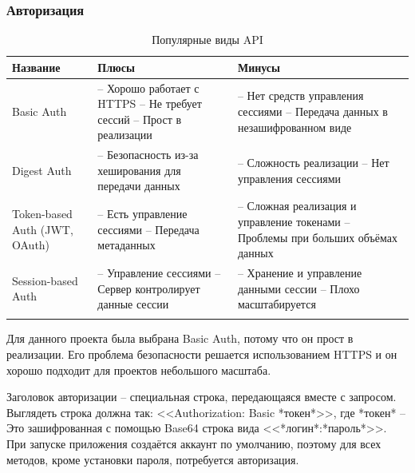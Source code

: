\documentclass[a4paper,article]{article}
\begin{document}
\begin{sloppypar}
    \subsubsection{Авторизация}

    \begin{xltabular}{\textwidth} { |
            >{\hsize} X |
            >{\hsize} X |
            >{\hsize} X | }
        \hline
        Название & Плюсы & Минусы \\
        \hline
        Basic Auth
        & -- Хорошо работает с HTTPS \newline -- Не требует сессий \newline -- Прост в реализации
        & -- Нет средств управления сессиями \newline -- Передача данных в незашифрованном виде \\
        \hline
        Digest Auth
        & -- Безопасность из-за хеширования для передачи данных
        & -- Сложность реализации \newline -- Нет управления сессиями \\
        \hline
        Token-based Auth \newline (JWT, OAuth)
        & -- Есть управление сессиями \newline -- Передача метаданных
        & -- Сложная реализация и управление токенами \newline -- Проблемы при больших объёмах данных \\
        \hline
        Session-based Auth
        & -- Управление сессиями \newline -- Сервер контролирует данные сессии
        & -- Хранение и управление данными сессии \newline -- Плохо масштабируется \\
        \hline

        \caption{\centering Популярные виды API}

        \label{tab:Авторизация}
    \end{xltabular}

    Для данного проекта была выбрана Basic Auth, потому что он прост в реализации. Его проблема безопасности решается использованием HTTPS и он хорошо подходит для проектов небольшого масштаба.

    Заголовок авторизации -- специальная строка, передающаяся вместе с запросом. Выглядеть строка должна так: <<Authorization: Basic *токен*>>, где *токен* -- Это зашифрованная с помощью Base64 строка вида <<*логин*:*пароль*>>. При запуске приложения создаётся аккаунт по умолчанию, поэтому для всех методов, кроме установки пароля, потребуется авторизация.


\end{sloppypar}
\end{document}
